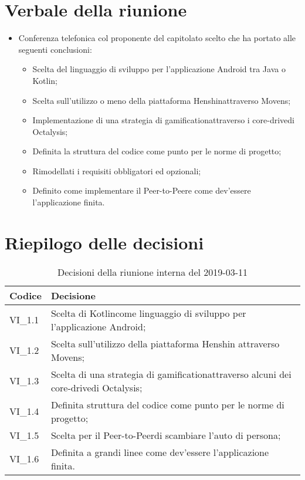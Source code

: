 \section{Verbale della riunione}
\begin{itemize}
	\item Conferenza telefonica col proponente del capitolato scelto che ha portato alle seguenti conclusioni:
	\begin{itemize}
		\item Scelta del linguaggio di sviluppo per l'applicazione Android tra Java o Kotlin\glo;
		\item Scelta sull'utilizzo o meno della piattaforma Henshin\glosp attraverso Movens\glo;
		\item Implementazione di una strategia di gamification\glosp attraverso i core-drive\glosp di Octalysis\glo;
		\item Definita la struttura del codice come punto per le norme di progetto;
		\item Rimodellati i requisiti obbligatori ed opzionali;
		\item Definito come implementare il Peer-to-Peer\glosp e come dev'essere l'applicazione finita.   
	\end{itemize}
\end{itemize}
\pagebreak
\section{Riepilogo delle decisioni}

	
	\begin{longtable}{ >{\centering}p{} >{}p{}}
		\caption{Decisioni della riunione interna del 2019-03-11}\\	
		\rowcolorhead
		\textbf{\color{white}Codice} 
		& \centering\textbf{\color{white}Decisione} 
		\tabularnewline 
		\endfirsthead
		VI\_1.1 & Scelta di Kotlin\glosp come linguaggio di sviluppo per l'applicazione Android;
		
		\tabularnewline 
		VI\_1.2 & Scelta sull'utilizzo della piattaforma Henshin attraverso Movens\glo;
		
		\tabularnewline 
		VI\_1.3 & Scelta di una strategia di gamification\glosp attraverso alcuni dei core-drive\glosp di Octalysis\glo;
	
		\tabularnewline 
		VI\_1.4 & Definita struttura del codice come punto per le norme di progetto;
		
		\tabularnewline 
		VI\_1.5 & Scelta per il Peer-to-Peer\glosp di scambiare l'auto di persona;
		
		\tabularnewline 
		VI\_1.6 & Definita a grandi linee come dev'essere l'applicazione finita.	
	\end{longtable}
	




